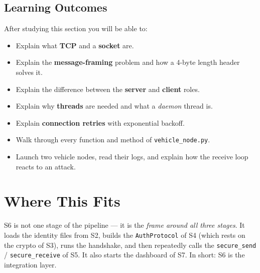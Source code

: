\documentclass[11pt,a4paper]{report}
\begin{document}
\subsection*{Learning Outcomes}
After studying this section you will be able to:
\begin{itemize}
  \item Explain what \textbf{TCP} and a \textbf{socket} are.
  \item Explain the \textbf{message-framing} problem and how a 4-byte length
        header solves it.
  \item Explain the difference between the \textbf{server} and \textbf{client}
        roles.
  \item Explain why \textbf{threads} are needed and what a \emph{daemon} thread is.
  \item Explain \textbf{connection retries} with exponential backoff.
  \item Walk through every function and method of \texttt{vehicle\_node.py}.
  \item Launch two vehicle nodes, read their logs, and explain how the receive
        loop reacts to an attack.
\end{itemize}

\section{Where This Fits}

S6 is not one stage of the pipeline --- it is the \emph{frame around all three
stages}. It loads the identity files from S2, builds the \texttt{AuthProtocol}
of S4 (which rests on the crypto of S3), runs the handshake, and then repeatedly
calls the \texttt{secure\_send} / \texttt{secure\_receive} of S5. It also starts
the dashboard of S7. In short: S6 is the integration layer.

\begin{center}
\end{center}
\end{document}
